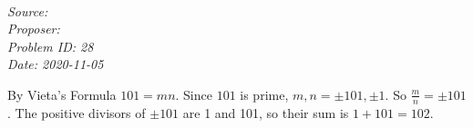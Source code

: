 \SSbreak\\
\emph{Source: \Cop}\\
\emph{Proposer: \Pkiesh}\\
\emph{Problem ID: 28}\\
\emph{Date: 2020-11-05}\\
\SSbreak

\bigskip 

\begin{solution}\hfil\medskip 

    By Vieta's Formula $101 = mn$. Since $101$ is prime, $m, n = \pm 101, \pm 1$. So $\frac mn = \pm 101$. 
    The positive divisors of $\pm 101$ are 1 and 101, so their sum is $1 + 101 = \boxed{102}$.
\end{solution}\bigskip
